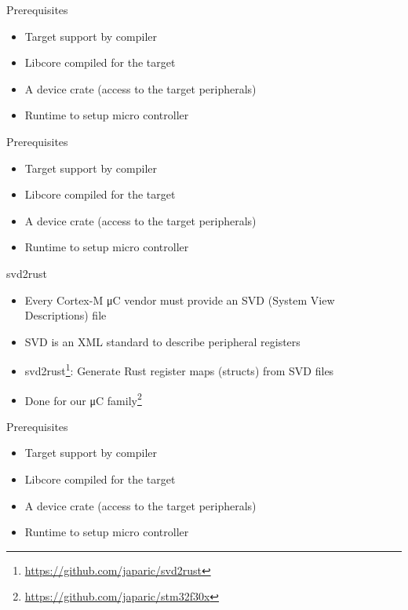 \documentclass[aspectratio=1610,14pt,t]{beamer}
\begin{document}
\begin{frame}[c]{Prerequisites}
  \begin{itemize}
    \item \Square Target support by compiler
    \item \Square Libcore compiled for the target
    \item \Square A device crate (access to the target peripherals)
    \item \Square Runtime to setup micro controller
  \end{itemize}
\end{frame}

\begin{frame}[c]{Prerequisites}
  \begin{itemize}
    \item \CheckedBox Target support by compiler
    \item \CheckedBox Libcore compiled for the target
    \item \Square A device crate (access to the target peripherals)
    \item \Square Runtime to setup micro controller
  \end{itemize}
\end{frame}

\begin{frame}[c]{svd2rust}
  \begin{itemize}
    \item Every Cortex-M μC vendor must provide an SVD (System View
      Descriptions) file
    \item SVD is an XML standard to describe peripheral registers
    \item svd2rust\footnote{\url{https://github.com/japaric/svd2rust}}:
      Generate Rust register maps (structs) from SVD files
    \item Done for our μC family\footnote{\url{https://github.com/japaric/stm32f30x}}
  \end{itemize}
\end{frame}

\begin{frame}[c]{Prerequisites}
  \begin{itemize}
    \item \CheckedBox Target support by compiler
    \item \CheckedBox Libcore compiled for the target
    \item \CheckedBox A device crate (access to the target peripherals)
    \item \Square Runtime to setup micro controller
  \end{itemize}
\end{frame}
\end{document}
